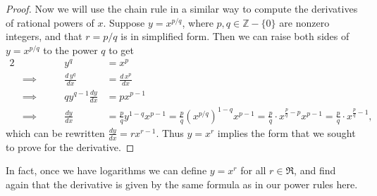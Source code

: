 \begin{proof}
Now we will use the chain rule in a similar way to compute the derivatives
of rational powers of $x$.  Suppose $y=x^{p/q}$, where
$p,q\in\mathbb{Z}-\{0\}$ are nonzero integers,
and that $r=p/q$ is in simplified form.  Then we can raise both
sides of $y=x^{p/q}$ to the power $q$ to get\footnotemark
{}
\begin{alignat*}{2}
&&y^q&=x^p\\
&\implies\qquad&\frac{d\,y^q}{dx}&=\frac{d\,x^p}{dx}\\
&\implies\qquad&qy^{q-1}\frac{dy}{dx}&=px^{p-1}\\
&\implies&\frac{dy}{dx}&=\frac{p}{q}y^{1-q}x^{p-1}
                       =\frac{p}q\left(x^{p/q}\right)^{1-q}x^{p-1}
                       =\frac{p}q\cdot x^{\frac{p}q-p}x^{p-1}
                       =\frac{p}q\cdot x^{\frac{p}q-1},\end{alignat*}
which can be rewritten  $\frac{dy}{dx}=rx^{r-1}$.  Thus $y=x^r$ implies the 
form that we sought to prove for the derivative.
\end{proof}

In fact, once we have logarithms we can define $y=x^r$ for all $r\in\Re$,
and find again that the derivative is given by the same formula as
in our power rules here.
\newpage


